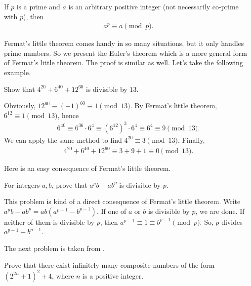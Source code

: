 \documentclass{subfile}
\begin{document}
		 \begin{corollary}
		 	If $p$ is a prime and $a$ is an arbitrary positive integer (not necessarily co-prime with $p$), then
		 	\begin{align*}
		 	a^p \equiv a \pmod p.
		 	\end{align*}
		 \end{corollary}	 
	Fermat's little theorem comes handy in so many situations, but it only handles prime numbers. So we present the Euler's theorem which is a more general form of Fermat's little theorem. The proof is similar as well. Let's take the following example.
	
		\begin{problem}
			Show that $4^{20} + 6^{40} + 12^{60}$ is divisible by $13$.
		\end{problem}
		
		\begin{solution}
			Obviously, $12^{60}\equiv (-1)^{60} \equiv 1 \pmod {13}$. By Fermat's little theorem, $6^{12} \equiv 1 \pmod{13}$, hence
				\begin{align*}
					6^{40} \equiv 6^{36} \cdot 6^4 \equiv \left(6^{12}\right)^3 \cdot 6^4 \equiv 6^4 \equiv 9 \pmod{13}.
				\end{align*}
			We can apply the same method to find $4^{20} \equiv 3 \pmod{13}$. Finally,
				\begin{align*}
					4^{20} + 6^{40} + 12^{60} \equiv 3+9+1 \equiv 0 \pmod{13}.
				\end{align*}
		\end{solution}
	Here \textcite[Page $29$, Example $1.29$]{andreescuandricafeng2007} is an easy consequence of Fermat's little theorem.
		\begin{problem}\label{e2}
			For integers $a,b$, prove that $a^pb-ab^p$ is divisible by $p$.
		\end{problem}
		
		\begin{solution}
			This problem is kind of a direct consequence of Fermat's little theorem. Write $a^pb-ab^p=ab(a^{p-1}-b^{p-1})$. If one of $a$ or $b$ is divisible by $p$, we are done. If neither of them is divisible by $p$, then $a^{p-1}\equiv1\equiv b^{p-1}\pmod p$. So, $p$ divides $a^{p-1}-b^{p-1}$.
		\end{solution}
	The next problem is taken from \cite[Problem $124$]{WaclawSierpinski1964}.
		\begin{problem}
			Prove that there exist infinitely many composite numbers of the form $(2^{2n}+1 )^2+4$, where $n$ is a positive integer.
		\end{problem}
		
\end{document}
